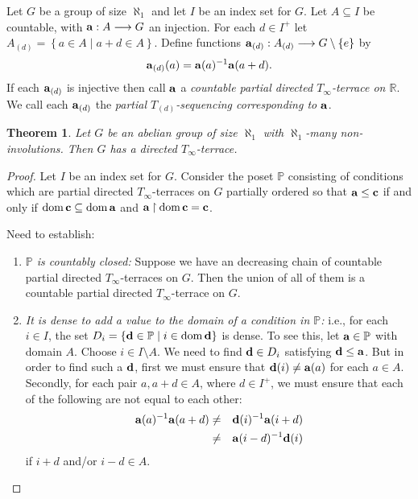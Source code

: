 \documentclass{amsart}
\newtheorem{theorem}{Theorem}
\theoremstyle{definition}
\theoremstyle{remark}
\renewcommand{\P}{\mathbb{P}}
\newcommand{\R}{\mathbb{R}}
\renewcommand{\c}{\mathfrak{c}}
\DeclareMathOperator{\dom}{dom}
\newcommand{\st}{\; | \;}
\newcommand{\set}[2]{\left\{#1\st #2 \right\}}
\newcommand{\rest}{\mathbin{\upharpoonright}}
\newcommand{\To}{\longrightarrow}
\renewcommand{\a}{\textup{\textbf{a}}}
\renewcommand{\c}{\textup{\textbf{c}}}
\renewcommand{\d}{\textup{\textbf{d}}}
\begin{document}
Let $G$ be a group of size $\aleph_1$ and let $I$ be an index set for $G$. Let $A \subseteq I$ be countable, with  $\a: A \To G$ an injection. For each $d \in I^+$ let $A_{(d)} = \set{a \in A}{a+d \in A}$. Define functions $\a_{(d)}: A_{(d)} \To G \setminus \{ e \}$ by $$\a_{(d)}(a) = \a(a)^{-1}\a(a+d).$$ If each $\a_{(d)}$ is injective then call $\a$ a \emph{countable partial directed $T_\infty$-terrace on $\R$}. We call each $\a_{(d)}$ the \emph{partial $T_{(d)}$-sequencing corresponding to $\a$}.

\begin{theorem}
Let $G$ be an abelian group of size $\aleph_1$ with $\aleph_1$-many non-involutions. Then $G$ has a directed $T_\infty$-terrace. 
\end{theorem}
\begin{proof}
Let $I$ be an index set for $G$. Consider the poset $\P$ consisting of conditions which are partial directed $T_\infty$-terraces on $G$ partially ordered so that $\a \leq \c$ if and only if $\dom \c \subseteq \dom \a$ and $\a \rest \dom \c = \c$.

Need to establish: \begin{enumerate}
	\item \emph{$\P$ is countably closed:} Suppose we have an decreasing chain of countable partial directed $T_\infty$-terraces on $G$. Then the union of all of them is a countable partial directed $T_\infty$-terrace on $G$.
	\item \label{item:DomainDense} \emph{It is dense to add a value to the domain of a condition in $\P$:} i.e., for each $i \in I$, the set $D_i=\set{\d \in \P}{i \in \dom \d }$ is dense. To see this, let $\a \in \P$ with domain $A$. Choose $i \in I \setminus A$. We need to find $\d \in D_i$ satisfying $\d \leq \a$. But in order to find such a $\d$, first we must ensure that $\d(i) \neq \a(a)$ for each $a \in A$. Secondly, for each pair $a, a+d \in A$, where $d \in I^+$, we must ensure that each of the following are not equal to each other:
	\begin{eqnarray*} \a(a)^{-1}\a(a+d) &\neq& \d(i)^{-1}\a(i+d)\\
								&\neq& \a(i-d)^{-1}\d(i)
	\end{eqnarray*} if $i+d$ and/or $i-d \in A$. 
	

\end{enumerate}
\end{proof}
\end{document}
